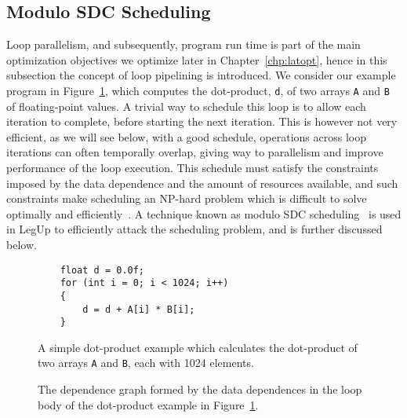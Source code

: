 \subsection{Modulo SDC Scheduling}
\label{bg:sub:modulo_sdc_scheduling}

Loop parallelism, and subsequently, program run time is part of the main
optimization objectives we optimize later in Chapter~\ref{chp:latopt}, hence
in this subsection the concept of loop pipelining is introduced.  We consider
our example program in Figure~\ref{bg:lst:dotprod}, which computes the
dot-product, \verb|d|, of two arrays \verb|A| and \verb|B| of floating-point
values.  A trivial way to schedule this loop is to allow each iteration to
complete, before starting the next iteration.  This is however not very
efficient, as we will see below, with a good schedule, operations across loop
iterations can often temporally overlap, giving way to parallelism and improve
performance of the loop execution.  This schedule must satisfy the constraints
imposed by the data dependence and the amount of resources available, and such
constraints make scheduling an NP-hard problem which is difficult to solve
optimally and efficiently~\cite{hwang91}.  A technique known as modulo SDC
scheduling~\cite{zhang13, canis14} is used in LegUp to efficiently attack the
scheduling problem, and is further discussed below.

\begin{figure}[ht]
    \centering
    \begin{minipage}{0.7\textwidth}
    \begin{lstlisting}
    float d = 0.0f;
    for (int i = 0; i < 1024; i++)
    {
        d = d + A[i] * B[i];
    }
    \end{lstlisting}
    \end{minipage}
    \caption{%
        A simple dot-product example which calculates the dot-product of two
        arrays \texttt{A} and \texttt{B}, each with 1024 elements.
    }\label{bg:lst:dotprod}
\end{figure}
\begin{figure}[ht]
    \centering
    \caption{%
        The dependence graph formed by the data dependences in the loop body of
        the dot-product example in Figure~\ref{bg:lst:dotprod}.
    }\label{bg:fig:dotprod_depgraph}
\end{figure}


